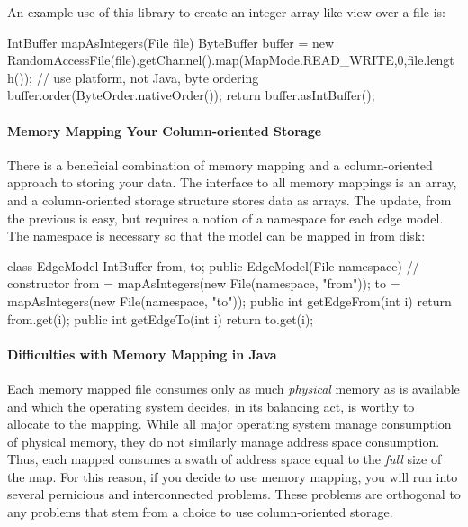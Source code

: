 An example use of this library to create an integer array-like view over a file
is:

\begin{shortlisting}
IntBuffer mapAsIntegers(File file) {
   ByteBuffer buffer = new RandomAccessFile(file).getChannel().map(MapMode.READ_WRITE,0,file.length());
   // use platform, not Java, byte ordering
   buffer.order(ByteOrder.nativeOrder());
   return buffer.asIntBuffer();
}
\end{shortlisting}

\paragraph{Memory Mapping Your Column-oriented Storage}

There is a beneficial combination of memory mapping and a column-oriented
approach to storing your data. The interface to all memory mappings is an
array, and a column-oriented storage structure stores data as arrays. The
update, from the previous  is easy, but requires a notion of a
namespace for each edge model. The namespace is necessary so that the model can
be mapped in from disk:

\begin{shortlisting}
class EdgeModel {
   IntBuffer from, to;
   public EdgeModel(File namespace) { // constructor
      from = mapAsIntegers(new File(namespace, "from"));
      to = mapAsIntegers(new File(namespace, "to"));
   }
   public int getEdgeFrom(int i) {
      return from.get(i);
   }
   public int getEdgeTo(int i) {
      return to.get(i);
   }
}
\end{shortlisting}

\paragraph{Difficulties with Memory Mapping in Java}

Each memory mapped file consumes only as much \emph{physical} memory as is
available and which the operating system decides, in its balancing act, is worthy
to allocate to the mapping. While all major operating system manage consumption
of physical memory, they do not similarly manage address space consumption. Thus,
each mapped  consumes a swath of address space equal to the
\emph{full} size of the map. For this reason, if you decide to use memory
mapping, you will run into several pernicious and interconnected problems. These
problems are orthogonal to any problems that stem from a choice to use
column-oriented storage.

